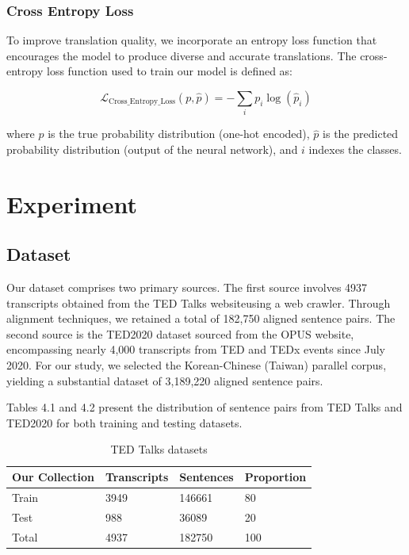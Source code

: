 \documentclass[PhD]{PHlab-thesis}
\begin{document}
\subsection{Cross Entropy Loss}
To improve translation quality, we incorporate an entropy loss function \cite{zhang2018generalized}that encourages the model to produce diverse and accurate translations. The cross-entropy loss function used to train our model is defined as:

\[
\mathcal{L}_{\text{Cross\_Entropy\_Loss}}(p, \hat{p}) = -\sum_{i} p_i \log(\hat{p}_i)
\]

where $p$ is the true probability distribution (one-hot encoded), $\hat{p}$ is the predicted probability distribution (output of the neural network), and $i$ indexes the classes.

\chapter{Experiment}
\section{Dataset}
Our dataset comprises two primary sources. The first source involves 4937 transcripts obtained from the TED Talks website\cite{tedTalks}using a web crawler. Through alignment techniques, we retained a total of 182,750 aligned sentence pairs. The second source is the TED2020 dataset\cite{reimers-2020-multilingual-sentence-bert} sourced from the OPUS website, encompassing nearly 4,000 transcripts from TED and TEDx events since July 2020. For our study, we selected the Korean-Chinese (Taiwan) parallel corpus, yielding a substantial dataset of 3,189,220 aligned sentence pairs.

Tables 4.1 and 4.2 present the distribution of sentence pairs from TED Talks and TED2020 for both training and testing datasets.


\begin{table}
\begin{tabularx}{0.9\linewidth}{p{3cm} p{3cm} p{3cm} p{3cm}}
Our Collection & Transcripts & Sentences & Proportion\\
\toprule
Train &  3949 & 146661 & 80\\[.3ex]
Test  &   988 & 36089 & 20 \\[.3ex]
\toprule
Total  &  4937 & 182750 & 100\\
\bottomrule
\end{tabularx}
\caption{TED Talks datasets}
\label{tab:notation}
\end{table}
\end{document}

